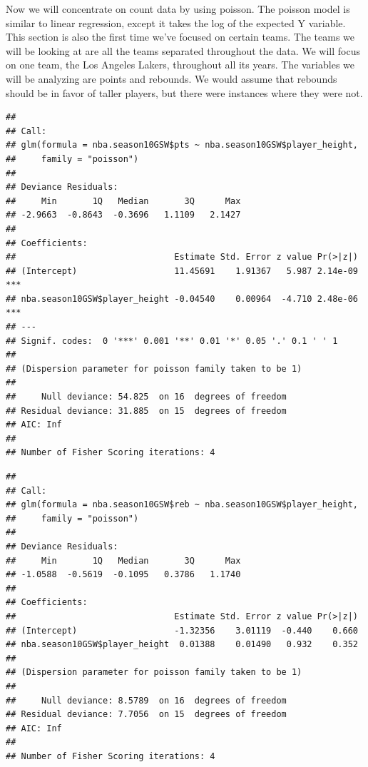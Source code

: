 \documentclass[11pt,letterpaper]{amsart}
\begin{document}
\indent Now we will concentrate on count data by using poisson. The poisson model is similar to linear regression, except it takes the log of the expected Y variable. This section is also the first time we've focused on certain teams. The teams we will be looking at are all the teams separated throughout the data. We will focus on one team, the Los Angeles Lakers, throughout all its years. The variables we will be analyzing are points and rebounds. We would assume that rebounds should be in favor of taller players, but there were instances where they were not. \\
\begin{verbatim}
## 
## Call:
## glm(formula = nba.season10GSW$pts ~ nba.season10GSW$player_height, 
##     family = "poisson")
## 
## Deviance Residuals: 
##     Min       1Q   Median       3Q      Max  
## -2.9663  -0.8643  -0.3696   1.1109   2.1427  
## 
## Coefficients:
##                               Estimate Std. Error z value Pr(>|z|)    
## (Intercept)                   11.45691    1.91367   5.987 2.14e-09 ***
## nba.season10GSW$player_height -0.04540    0.00964  -4.710 2.48e-06 ***
## ---
## Signif. codes:  0 '***' 0.001 '**' 0.01 '*' 0.05 '.' 0.1 ' ' 1
## 
## (Dispersion parameter for poisson family taken to be 1)
## 
##     Null deviance: 54.825  on 16  degrees of freedom
## Residual deviance: 31.885  on 15  degrees of freedom
## AIC: Inf
## 
## Number of Fisher Scoring iterations: 4
\end{verbatim}

\begin{verbatim}
## 
## Call:
## glm(formula = nba.season10GSW$reb ~ nba.season10GSW$player_height, 
##     family = "poisson")
## 
## Deviance Residuals: 
##     Min       1Q   Median       3Q      Max  
## -1.0588  -0.5619  -0.1095   0.3786   1.1740  
## 
## Coefficients:
##                               Estimate Std. Error z value Pr(>|z|)
## (Intercept)                   -1.32356    3.01119  -0.440    0.660
## nba.season10GSW$player_height  0.01388    0.01490   0.932    0.352
## 
## (Dispersion parameter for poisson family taken to be 1)
## 
##     Null deviance: 8.5789  on 16  degrees of freedom
## Residual deviance: 7.7056  on 15  degrees of freedom
## AIC: Inf
## 
## Number of Fisher Scoring iterations: 4
\end{verbatim}
\end{document}
